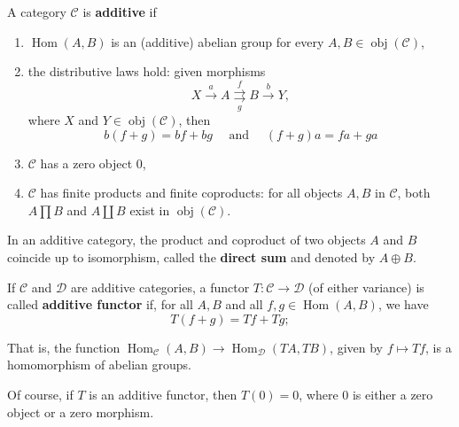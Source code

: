 \documentclass[12pt, oneside]{book}
\begin{document}
\begin{definition}
    A category $\mathcal{C}$ is \textbf{additive} if
    \begin{enumerate}[label=(\roman*)]
        \item
              $\operatorname{Hom}(A, B)$ is an (additive) abelian group for every $A, B \in \operatorname{obj}(\mathcal{C})$,
        \item
              the distributive laws hold: given morphisms
              \begin{equation*}
                  X \xrightarrow{a} A \underset{g}{\stackrel{f}{\rightrightarrows}} B \xrightarrow{b} Y,
              \end{equation*}
              where $X$ and $Y \in \operatorname{obj}(\mathcal{C})$, then
              \begin{equation*}
                  b(f+g)=b f+b g \quad \text { and } \quad(f+g) a=f a+g a
              \end{equation*}
        \item $\mathcal{C}$ has a zero object $0$,
        \item
              $\mathcal{C}$ has finite products and finite coproducts: for all objects $A, B$ in $\mathcal{C}$, both $A \prod B$ and $A \coprod B$ exist in $\operatorname{obj}(\mathcal{C})$.
    \end{enumerate}
    \begin{remark}
        In an additive category, the product and coproduct of two objects $A$ and $B$ coincide up to isomorphism, called the \textbf{direct sum} and denoted by $A \oplus B$.
    \end{remark}
\end{definition}

\begin{definition}
    If $\mathcal{C}$ and $\mathcal{D}$ are additive categories, a functor $T: \mathcal{C} \rightarrow \mathcal{D}$ (of either variance) is called \textbf{additive functor} if, for all $A, B$ and all $f, g \in \operatorname{Hom}(A, B)$, we have
    \begin{equation*}
        T(f+g)=T f+T g ;
    \end{equation*}
    \begin{remark}
        That is, the function $\operatorname{Hom}_{\mathcal{C}}(A, B) \rightarrow \operatorname{Hom}_{\mathcal{D}}(T A, T B)$, given by $f \mapsto T f$, is a homomorphism of abelian groups.

        Of course, if $T$ is an additive functor, then $T(0)=0$, where 0 is either a zero object or a zero morphism.
    \end{remark}
\end{definition}
\end{document}
